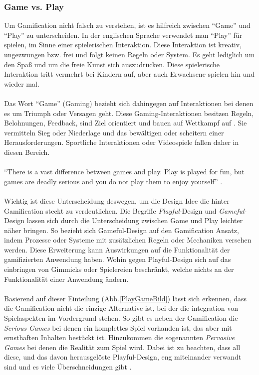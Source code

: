 \documentclass[a4paper,12pt]{scrartcl}
\begin{document}
\subsubsection{Game vs. Play}
Um Gamification nicht falsch zu verstehen, ist es hilfreich zwischen \enquote{Game} und \enquote{Play} zu unterscheiden. In der englischen Sprache verwendet man \enquote{Play} für spielen, im Sinne einer spielerischen Interaktion. Diese Interaktion ist kreativ, ungezwungen bzw. frei und folgt keinen Regeln oder System. Es geht lediglich um den Spaß und um die freie Kunst sich auszudrücken. Diese spielerische Interaktion tritt vermehrt bei Kindern auf, aber auch Erwachsene spielen hin und wieder mal. 
\\\\
Das Wort \enquote{Game} (Gaming) bezieht sich dahingegen auf Interaktionen bei denen es um Triumph oder Versagen geht. Diese Gaming-Interaktionen besitzen Regeln, Belohnungen, Feedback, sind Ziel orientiert und bauen auf Wettkampf auf \cite{Deterding2011}. Sie vermitteln Sieg oder Niederlage und das bewältigen oder scheitern einer Herausforderungen. Sportliche Interaktionen oder Videospiele fallen daher in diesen Bereich. 
\\\\
\enquote{There is a vast difference between games and play. Play is played for fun, but games are deadly serious and you do not play them to enjoy yourself} \cite{Baring2014}.
\\\\
Wichtig ist diese Unterscheidung deswegen, um die Design Idee die hinter Gamification steckt zu verdeutlichen. Die Begriffe \textit{Playful}-Design und \textit{Gameful}-Design lassen sich durch die Unterscheidung zwischen Game und Play leichter näher bringen. So bezieht sich Gameful-Design auf den Gamification Ansatz, indem Prozesse oder Systeme mit zusätzlichen Regeln oder Mechaniken versehen werden. Diese Erweiterung kann Auswirkungen auf die Funktionalität der gamifizierten Anwendung haben. Wohin gegen Playful-Design sich auf das einbringen von Gimmicks oder Spielereien beschränkt, welche nichts an der Funktionalität einer Anwendung ändern. 
\\\\
Basierend auf dieser Einteilung (Abb.\ref{PlayGameBild}) lässt sich erkennen, dass die Gamification nicht die einzige Alternative ist, bei der die integration von Spielaspekten im Vordergrund stehen. So gibt es neben der Gamification die \textit{Serious Games} bei denen ein komplettes Spiel vorhanden ist, das aber mit ernsthaften Inhalten bestückt ist. Hinzukommen die sogenannten \textit{Pervasive Games} bei denen die Realität zum Spiel wird. Dabei ist zu beachten, dass all diese, und das davon herausgelöste Playful-Design, eng miteinander verwandt sind und es viele Überschneidungen gibt \cite{Deterding2011}.
\end{document}
